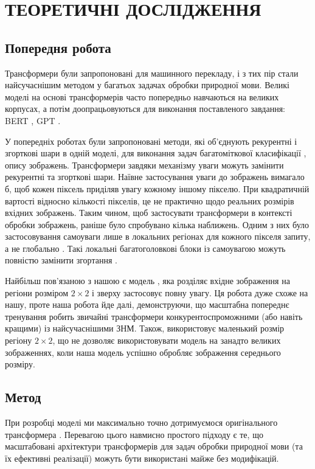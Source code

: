 \chapter{ТЕОРЕТИЧНІ ДОСЛІДЖЕННЯ}
\section{Попередня робота}
Трансформери були запропоновані \cite{attention-all-need}
для машинного перекладу, і з тих пір стали
найсучаснішим методом у багатьох задачах обробки природної
мови. Великі моделі на основі трансформерів
часто попередньо навчаються на великих корпусах, а потім
доопрацьовуються для виконання поставленого завдання:
BERT \cite{bert}, GPT \cite{gpt}.

У попередніх роботах були запропоновані методи, які об'єднують
рекурентні і згорткові шари в одній моделі, для виконання задач
багатоміткової класифікації \cite{nn:cnn-rnn}, опису зображень.
Трансформери завдяки механізму уваги можуть
замінити рекурентні та згорткові шари. Наївне застосування
уваги до зображень вимагало б, щоб кожен піксель приділяв
увагу кожному іншому пікселю. При квадратичній вартості відносно кількості
пікселів, це не практично щодо реальних розмірів
вхідних зображень. Таким чином, щоб застосувати
трансформери в контексті обробки зображень,
раніше було спробувано кілька наближень. Одним з них
було застосовування самоуваги лише в локальних
регіонах для кожного пікселя запиту, а не глобально \cite{image-trans}.
Такі локальні багатоголовкові блоки із самоувагою
можуть повністю замінити згортання \cite{local-regions-attention}.

Найбільш пов’язаною з нашою є модель \cite{cordonnier},
яка розділяє вхідне зображення на регіони розміром
$2 \times 2$ і зверху застосовує повну увагу. Ця робота
дуже схоже на нашу, проте наша робота йде далі,
демонструючи, що масштабна попереднє тренування
робить звичайні трансформери
конкурентоспроможними (або навіть кращими) із найсучаснішими ЗНМ.
Також, \cite{cordonnier} використовує маленький розмір
регіону $2 \times 2$, що не дозволяє використовувати модель
на занадто великих зображеннях, коли наша модель успішно обробляє
зображення середнього розміру.

\section{Метод}

При розробці моделі ми максимально точно дотримуємося
оригінального трансформера \cite{attention-all-need}.
Перевагою цього навмисно простого підходу
є те, що масштабовані архітектури трансформерів
для задач обробки природної мови (та їх ефективні реалізації)
можуть бути використані майже без модифікацій.

